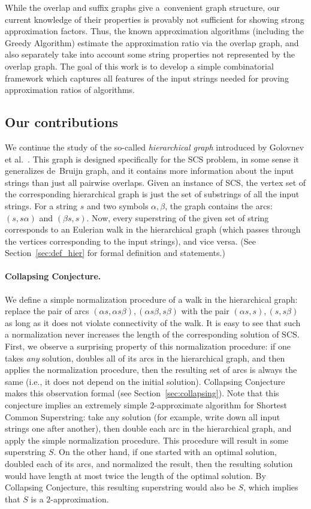 While the overlap and suffix graphs give a~convenient graph structure, our current knowledge of their properties is provably not sufficient for showing strong approximation factors. Thus, the known approximation algorithms (including the Greedy Algorithm) estimate the approximation ratio via the overlap graph, and also separately take into account some string properties not represented by the overlap graph. The goal of this work is to develop a simple combinatorial framework which captures all features of the input strings needed for proving approximation ratios of algorithms.

\subsection{Our contributions}

We continue the study of the so-called {\em hierarchical graph}
introduced by Golovnev et al.~\cite{scs_exact}. This graph is designed specifically 
for the SCS problem, in some sense it generalizes de~Bruijn graph, and it contains more information about the input strings
than just all pairwise overlaps. Given an instance of SCS, the vertex set of the corresponding hierarchical graph is just the set of substrings of all the input strings. For a string $s$ and two symbols $\alpha, \beta$, the graph contains the arcs: $(s,s\alpha)$ and $(\beta s, s)$. Now, every superstring of the given set of string corresponds to an Eulerian walk in the hierarchical graph (which passes through the vertices corresponding to the input strings), and vice versa. (See Section~\ref{sec:def_hier} for formal definition and statements.)

\paragraph{Collapsing Conjecture.}
We define a simple normalization procedure of a walk in the hierarchical graph: replace the pair of arcs $(\alpha s, \alpha s \beta), (\alpha s \beta, s\beta)$ with the pair $(\alpha s, s ), (s , s\beta)$ as long as it does not violate connectivity of the walk. It is easy to see that such a normalization never increases the length of the corresponding solution of SCS. 
First, we observe a surprising property of this normalization procedure: if one takes \emph{any} solution, doubles all of its arcs in the hierarchical graph, and then applies the normalization procedure, then the resulting set of arcs is always the same (i.e., it does not depend on the initial solution). Collapsing Conjecture makes this observation formal (see Section~\ref{sec:collapsing}). Note that this conjecture implies an extremely simple 2-approximate algorithm for Shortest Common Superstring: take any solution (for example, write down all input strings one after another), then double each arc in the hierarchical graph, and apply the simple normalization procedure. This procedure will result in some superstring $S$. On the other hand, if one started with an optimal solution, doubled each of its arcs, and normalized the result, then the resulting solution would have length at most twice the length of the optimal solution. By Collapsing Conjecture, this resulting superstring would also be $S$, which implies that $S$ is a $2$-approximation.

